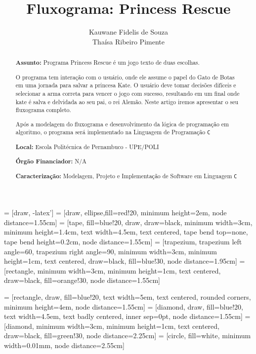 \documentclass[a4paper,12pt]{article} %
\title{Fluxograma: Princess Rescue}
\author{Kauwane Fidelis de Souza\\ Thaísa Ribeiro Pimente}
\begin{document}
\maketitle


 = [draw, -latex']
 = [draw, ellipse,fill=red!20, minimum height=2em, node distance=1.55cm]
 = [tape, fill=blue!20, draw, draw=black, minimum width=3cm, minimum height=1.4cm, text width=4.5em, text centered, tape bend top=none, tape bend height=0.2cm, node distance=1.55cm]
 = [trapezium, trapezium left angle=60, trapezium right angle=90, minimum width=3cm, minimum height=1cm, text centered, draw=black, fill=blue!30, node distance=1.95cm]
 = [rectangle, minimum width=3cm, minimum height=1cm, text centered, draw=black, fill=orange!30, node distance=1.55cm]

 = [rectangle, draw, fill=blue!20, text width=5em, text centered, rounded corners, minimum height=4em, node distance=1.55cm]
 = [diamond, draw, fill=blue!20, text width=4.5em, text badly centered, inner sep=0pt, node distance=1.55cm]
 = [diamond, minimum width=3cm, minimum height=1cm, text centered, draw=black, fill=green!30, node distance=2.25cm]
 = [circle, fill=white, minimum width=0.01mm, node distance=2.55cm]


\begin{abstract}

\textbf{Assunto:}  Programa Princess Rescue é um jogo texto de duas escolhas.


O programa tem interação com o usuário, onde ele assume o papel do Gato de Botas em uma jornada para salvar a princesa Kate.
O usuário deve tomar decisões difíceis e selecionar a arma correta para vencer o jogo com sucesso,
resultando em um final onde kate é salva e delvidada ao seu pai, o rei Alemão. Neste artigo iremos apresentar o seu fluxograma completo.

Após a modelagem do fluxograma e desenvolvimento da lógica de programação em algoritmo,
o programa será implementado na Linguagem de Programação \texttt{C}


\textbf{Local:} Escola Politécnica de Pernambuco - UPE/POLI

\textbf{Órgão Financiador:} N/A

\textbf{Caracterização:} Modelagem, Projeto e Implementação de Software em Linguagem \texttt{C}


\end{abstract}
\end{document}
